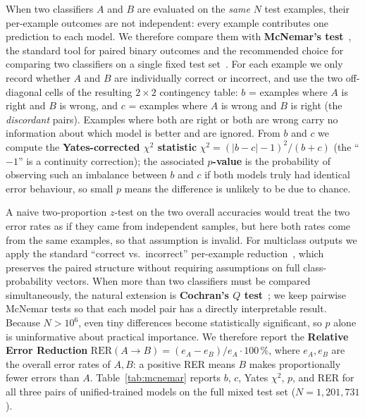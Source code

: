 \documentclass[runningheads]{llncs}
\begin{document}
When two classifiers $A$ and $B$ are evaluated on the \emph{same} $N$ test examples, their per-example outcomes are not independent: every example contributes one prediction to each model. We therefore compare them with \textbf{McNemar's test}~\cite{mcnemar1947note}, the standard tool for paired binary outcomes and the recommended choice for comparing two classifiers on a single fixed test set~\cite{dietterich1998approximate}. For each example we only record whether $A$ and $B$ are individually correct or incorrect, and use the two off-diagonal cells of the resulting $2\!\times\!2$ contingency table: $b$ = examples where $A$ is right and $B$ is wrong, and $c$ = examples where $A$ is wrong and $B$ is right (the \emph{discordant} pairs). Examples where both are right or both are wrong carry no information about which model is better and are ignored. From $b$ and $c$ we compute the \textbf{Yates-corrected $\chi^{2}$ statistic} $\chi^{2}=(|b-c|-1)^{2}/(b+c)$ (the ``$-1$'' is a continuity correction); the associated \textbf{$p$-value} is the probability of observing such an imbalance between $b$ and $c$ if both models truly had identical error behaviour, so small $p$ means the difference is unlikely to be due to chance.

A naive two-proportion $z$-test on the two overall accuracies would treat the two error rates as if they came from independent samples, but here both rates come from the same examples, so that assumption is invalid. For multiclass outputs we apply the standard ``correct vs.\ incorrect'' per-example reduction~\cite{dietterich1998approximate}, which preserves the paired structure without requiring assumptions on full class-probability vectors. When more than two classifiers must be compared simultaneously, the natural extension is \textbf{Cochran's $Q$ test}~\cite{cochran1950q}; we keep pairwise McNemar tests so that each model pair has a directly interpretable result. Because $N>10^{6}$, even tiny differences become statistically significant, so $p$ alone is uninformative about practical importance. We therefore report the \textbf{Relative Error Reduction} $\mathrm{RER}(A\!\to\!B)=(e_A-e_B)/e_A\cdot 100\,\%$, where $e_A,e_B$ are the overall error rates of $A,B$: a positive RER means $B$ makes proportionally fewer errors than $A$. Table~\ref{tab:mcnemar} reports $b$, $c$, Yates $\chi^{2}$, $p$, and RER for all three pairs of unified-trained models on the full mixed test set ($N=1{,}201{,}731$).
\end{document}
